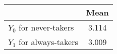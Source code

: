 \begin{tabular}{l*{1}{c}}
\hline\hline
            &        Mean\\
\hline
$ Y_0 $ for never-takers&       3.114\\
$ Y_1 $ for always-takers&       3.009\\
\hline\hline
\end{tabular}
